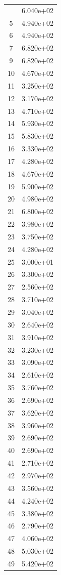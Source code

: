 \documentclass[12pt]{article}
\begin{document}
\begin{longtable}{@{}cc@{}}
\bottomrule
\endlastfoot
4 & 6.040e+02 \\
5 & 4.940e+02 \\
6 & 4.940e+02 \\
7 & 6.820e+02 \\
9 & 6.820e+02 \\
10 & 4.670e+02 \\
11 & 3.250e+02 \\
12 & 3.170e+02 \\
13 & 4.710e+02 \\
14 & 5.930e+02 \\
15 & 5.830e+02 \\
16 & 3.330e+02 \\
17 & 4.280e+02 \\
18 & 4.670e+02 \\
19 & 5.900e+02 \\
20 & 4.980e+02 \\
21 & 6.800e+02 \\
22 & 3.980e+02 \\
23 & 3.750e+02 \\
24 & 4.280e+02 \\
25 & 3.000e+01 \\
26 & 3.300e+02 \\
27 & 2.560e+02 \\
28 & 3.710e+02 \\
29 & 3.040e+02 \\
30 & 2.640e+02 \\
31 & 3.910e+02 \\
32 & 3.230e+02 \\
33 & 3.090e+02 \\
34 & 2.610e+02 \\
35 & 3.760e+02 \\
36 & 2.690e+02 \\
37 & 3.620e+02 \\
38 & 3.960e+02 \\
39 & 2.690e+02 \\
40 & 2.690e+02 \\
41 & 2.710e+02 \\
42 & 2.970e+02 \\
43 & 3.560e+02 \\
44 & 4.240e+02 \\
45 & 3.380e+02 \\
46 & 2.790e+02 \\
47 & 4.060e+02 \\
48 & 5.030e+02 \\
49 & 5.420e+02 \\

\end{longtable}
\end{document}
